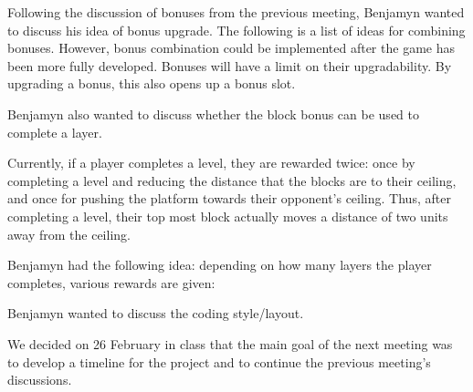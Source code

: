 

Following the discussion of bonuses from the previous meeting, Benjamyn wanted
to discuss his idea of bonus upgrade. The following is a list of ideas for
combining bonuses. However, bonus combination could be implemented after the
game has been more fully developed. Bonuses will have a limit on their
upgradability. By upgrading a bonus, this also opens up a bonus slot.
\benum
\eenum

Benjamyn also wanted to discuss whether the block bonus can be used to complete
a layer.

Currently, if a player completes a level, they are rewarded twice: once by
completing a level and reducing the distance that the blocks are to their
ceiling, and once for pushing the platform towards their opponent's ceiling.
Thus, after completing a level, their top most block actually moves a distance
of two units away from the ceiling.

Benjamyn had the following idea: depending on how many layers the player
completes, various rewards are given:
\bitem
\eitem


Benjamyn wanted to discuss the coding style/layout.


We decided on 26 February in class that the main goal of the next meeting was
to develop a timeline for the project and to continue the previous meeting's
discussions.


